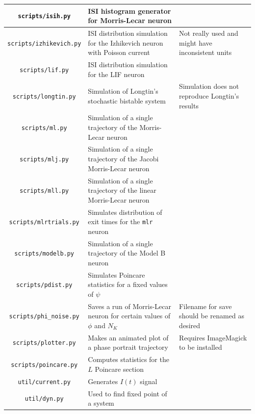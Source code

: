 \documentclass[letterpaper,12pt]{article}
\numberwithin{table}{section}
\numberwithin{figure}{section}
\numberwithin{equation}{section}
\begin{document}
\begin{flushleft}
\begin{center}
\begin{tabularx}{\linewidth}{ | c | Y | X | }
            \hline
            \texttt{scripts/isih.py} & ISI histogram generator for Morris-Lecar neuron & \\
            \hline
            \texttt{scripts/izhikevich.py} & ISI distribution simulation for the Izhikevich neuron with Poisson current & Not really used and might have inconsistent units \\
            \hline
            \texttt{scripts/lif.py} & ISI distribution simulation for the LIF neuron & \\
            \hline
            \texttt{scripts/longtin.py} & Simulation of Longtin's stochastic bistable system & Simulation does not reproduce Longtin's results \\
            \hline
            \texttt{scripts/ml.py} & Simulation of a single trajectory of the Morris-Lecar neuron & \\
            \hline
            \texttt{scripts/mlj.py} & Simulation of a single trajectory of the Jacobi Morris-Lecar neuron & \\
            \hline
            \texttt{scripts/mll.py} & Simulation of a single trajectory of the linear Morris-Lecar neuron & \\
            \hline
            \texttt{scripts/mlrtrials.py} & Simulates distribution of exit times for the \texttt{mlr} neuron & \\
            \hline
            \texttt{scripts/modelb.py} & Simulation of a single trajectory of the Model B neuron & \\
            \hline
            \texttt{scripts/pdist.py} & Simulates Poincare statistics for a fixed values of $\psi$ & \\
            \hline
            \texttt{scripts/phi\_noise.py} & Saves a run of Morris-Lecar neuron for certain values of$\phi$ and $N_K$ & Filename for save should be renamed as desired \\
            \hline
            \texttt{scripts/plotter.py} & Makes an animated plot of a phase portrait trajectory & Requires ImageMagick to be installed \\
            \hline
            \texttt{scripts/poincare.py} & Computes statistics for the $L$ Poincare section & \\
            \hline
            \texttt{util/current.py} & Generates $I(t)$ signal & \\
            \hline
            \texttt{util/dyn.py} & Used to find fixed point of a system & \\
            \hline

\end{tabularx}
\end{center}
\end{flushleft}
\end{document}
